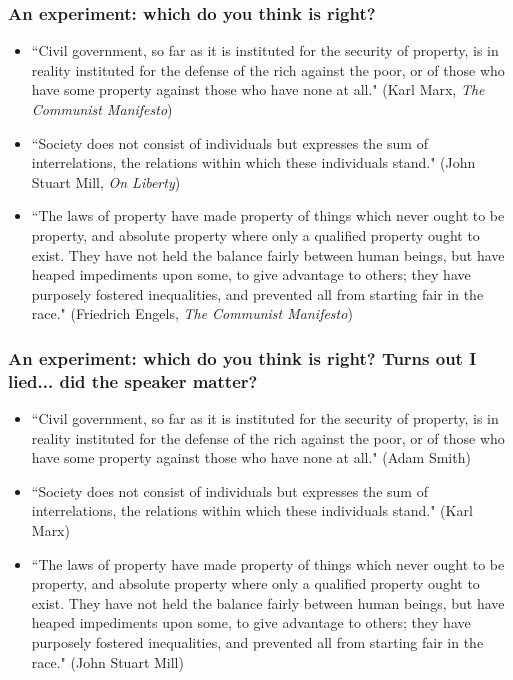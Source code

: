\documentclass[aspectratio=169]{beamer}
\theoremstyle{principle}
\begin{document}
\begin{frame}
\frametitle{An experiment: which do you think is right?}

\begin{itemize}
\item ``Civil government, so far as it is instituted for the security of property, is in reality instituted for the defense of the rich against the poor, or of those who have some property against those who have none at all."  (Karl Marx, \textit{The Communist Manifesto})
\bigskip
\bigskip
\item ``Society does not consist of individuals but expresses the sum of interrelations, the relations within which these individuals stand." (John Stuart Mill, \textit{On Liberty})
\bigskip
\bigskip
\item ``The laws of property have made property of things which never ought to be property, and absolute property where only a qualified property ought to exist. They have not held the balance fairly between human beings, but have heaped impediments upon some, to give advantage to others; they have purposely fostered inequalities, and prevented all from starting fair in the race." (Friedrich Engels, \textit{The Communist Manifesto})
\end{itemize}

\end{frame}

\begin{frame}
\frametitle{An experiment: which do you think is right?  Turns out I lied... did the speaker matter?}

\begin{itemize}
\item ``Civil government, so far as it is instituted for the security of property, is in reality instituted for the defense of the rich against the poor, or of those who have some property against those who have none at all."  (Adam Smith)
\bigskip
\bigskip
\item ``Society does not consist of individuals but expresses the sum of interrelations, the relations within which these individuals stand." (Karl Marx)
\bigskip
\bigskip
\item ``The laws of property have made property of things which never ought to be property, and absolute property where only a qualified property ought to exist. They have not held the balance fairly between human beings, but have heaped impediments upon some, to give advantage to others; they have purposely fostered inequalities, and prevented all from starting fair in the race." (John Stuart Mill)
\end{itemize}

\end{frame}
\end{document}
